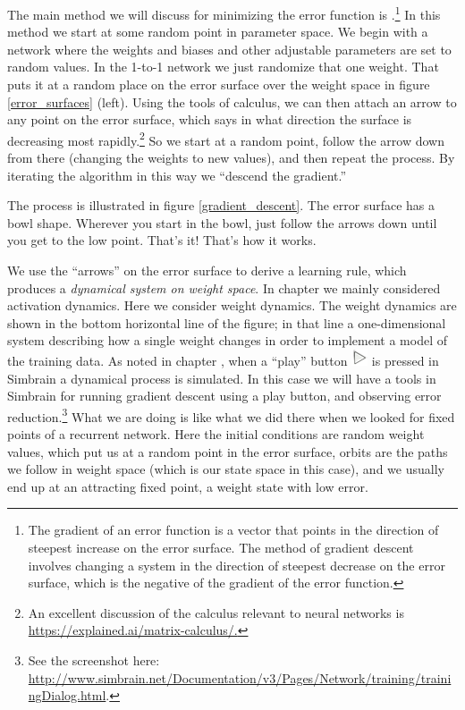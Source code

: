 The main method we will discuss for minimizing the error function is  .\footnote{The gradient of an error function is a vector that points in the direction of steepest increase on the error surface. The method of gradient descent involves changing a system in the direction of steepest decrease on the error surface, which is the negative of the gradient of the error function.}  In this method we start at some random point in parameter space. We begin with a network where the weights and biases and other adjustable parameters are set to random values. In the 1-to-1 network we just randomize that one weight. That puts it at a random place on the error surface over the weight space in figure \ref{error_surfaces} (left). Using the tools of calculus, we can then attach an arrow to any point on the error surface, which says in what direction the surface is decreasing most rapidly.\footnote{An excellent discussion of the calculus relevant to neural networks is \url{https://explained.ai/matrix-calculus/.}} So we start at a random point, follow the arrow down from there (changing the weights to new values), and then repeat the process. By iterating the algorithm in this way we ``descend the gradient.''

The process is illustrated in figure \ref{gradient_descent}. The error surface has a bowl shape. Wherever you start in the bowl, just follow the arrows down until you get to the low point. That's it!  That's how it works. 

We use the ``arrows'' on the error surface to derive a learning rule, which produces a \emph{dynamical system on weight space}. In chapter  we mainly considered activation dynamics. Here we consider weight dynamics. The weight dynamics are shown in the bottom horizontal line of the figure; in that line a one-dimensional system describing how a single weight changes in order to implement a model of the training data. As noted in chapter , when a ``play''  button \includegraphics[scale=.5]{./images/Play.png} is pressed in Simbrain  a dynamical process is simulated. In this case we will have a tools in Simbrain for running gradient descent using a play button, and observing error reduction.\footnote{See the screenshot here: \url{http://www.simbrain.net/Documentation/v3/Pages/Network/training/trainingDialog.html}.} What we are doing is like what we did there when we looked for fixed points of a recurrent network. Here the initial conditions are random weight values, which put us at a random point in the error surface, orbits are the paths we follow in weight space (which is our state space in this case), and we usually end up  at an attracting fixed point, a weight state with low error. 

